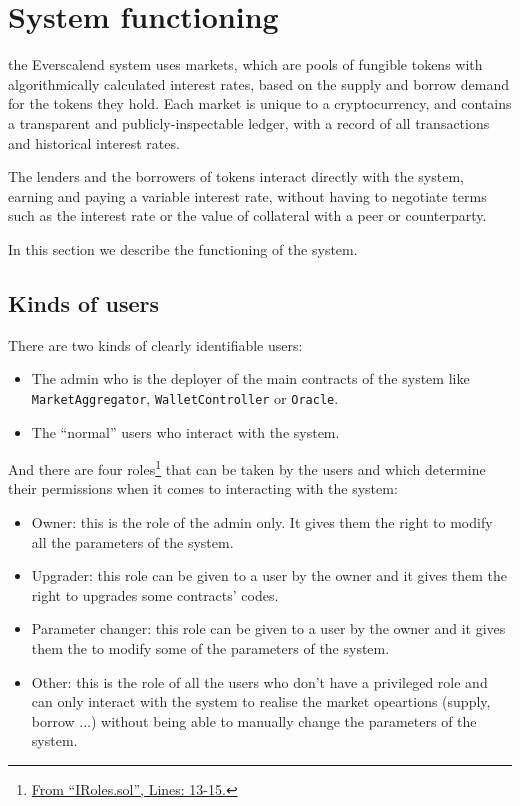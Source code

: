 \section{System functioning}

the Everscalend system uses markets, which are pools of fungible tokens with algorithmically calculated interest rates, based on the supply and borrow demand for the tokens they hold. Each market is unique to a cryptocurrency, and contains a transparent and publicly-inspectable ledger, with a record of all transactions and historical interest rates.

The lenders and the borrowers of tokens interact directly with the system, earning and paying a variable interest rate, without having to negotiate terms such as the interest rate or the value of collateral with a peer or counterparty.

In this section we describe the functioning of the system.

\subsection{Kinds of users}

There are two kinds of clearly identifiable users:
\begin{itemize}
  \item The admin who is the deployer of the main contracts of the system like \verb|MarketAggregator|, \verb|WalletController| or \verb|Oracle|.
  \item The ``normal'' users who interact with the system.
\end{itemize}
And there are four roles\footnote{\href{https://github.com/SVOIcom/everscalend-contracts/blob/8d24e268f9c44bd3e896fb6a28bbf8a42c7027a9/smart-contracts/src/utils/interfaces/IRoles.sol\#L13-L15}{From ``IRoles.sol'', Lines: 13-15.}} that can be taken by the users and which determine their permissions when it comes to interacting with the system:
\begin{itemize}
  \item Owner: this is the role of the admin only. It gives them the right to modify all the parameters of the system.
  \item Upgrader: this role can be given to a user by the owner and it gives them the right to upgrades some contracts' codes.
  \item Parameter changer: this role can be given to a user by the owner and it gives them the to modify some of the parameters of the system.
  \item Other: this is the role of all the users who don't have a privileged role and can only interact with the system to realise the market opeartions (supply, borrow ...) without being able to manually change the parameters of the system.
\end{itemize}

